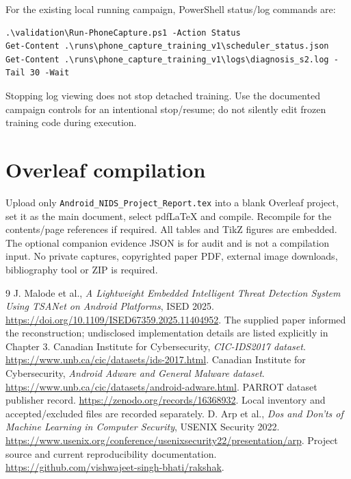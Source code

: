 \documentclass[11pt,a4paper,oneside]{report}
\newcommand{\code}[1]{\nolinkurl{#1}}
\begin{document}
For the existing local running campaign, PowerShell status/log commands are:
\begin{lstlisting}
.\validation\Run-PhoneCapture.ps1 -Action Status
Get-Content .\runs\phone_capture_training_v1\scheduler_status.json
Get-Content .\runs\phone_capture_training_v1\logs\diagnosis_s2.log -Tail 30 -Wait
\end{lstlisting}
Stopping log viewing does not stop detached training. Use the documented campaign controls for an intentional stop/resume; do not silently edit frozen training code during execution.

\section{Overleaf compilation}
Upload only \code{Android_NIDS_Project_Report.tex} into a blank Overleaf project, set it as the main document, select pdfLaTeX and compile. Recompile for the contents/page references if required. All tables and TikZ figures are embedded. The optional companion evidence JSON is for audit and is not a compilation input. No private captures, copyrighted paper PDF, external image downloads, bibliography tool or ZIP is required.

\begin{thebibliography}{9}
 J. Malode et al., \emph{A Lightweight Embedded Intelligent Threat Detection System Using TSANet on Android Platforms}, ISED 2025. \url{https://doi.org/10.1109/ISED67359.2025.11404952}. The supplied paper informed the reconstruction; undisclosed implementation details are listed explicitly in Chapter 3.
 Canadian Institute for Cybersecurity, \emph{CIC-IDS2017 dataset}. \url{https://www.unb.ca/cic/datasets/ids-2017.html}.
 Canadian Institute for Cybersecurity, \emph{Android Adware and General Malware dataset}. \url{https://www.unb.ca/cic/datasets/android-adware.html}.
 PARROT dataset publisher record. \url{https://zenodo.org/records/16368932}. Local inventory and accepted/excluded files are recorded separately.
 D. Arp et al., \emph{Dos and Don'ts of Machine Learning in Computer Security}, USENIX Security 2022. \url{https://www.usenix.org/conference/usenixsecurity22/presentation/arp}.
 Project source and current reproducibility documentation. \url{https://github.com/vishwajeet-singh-bhati/rakshak}.
\end{thebibliography}
\end{document}
